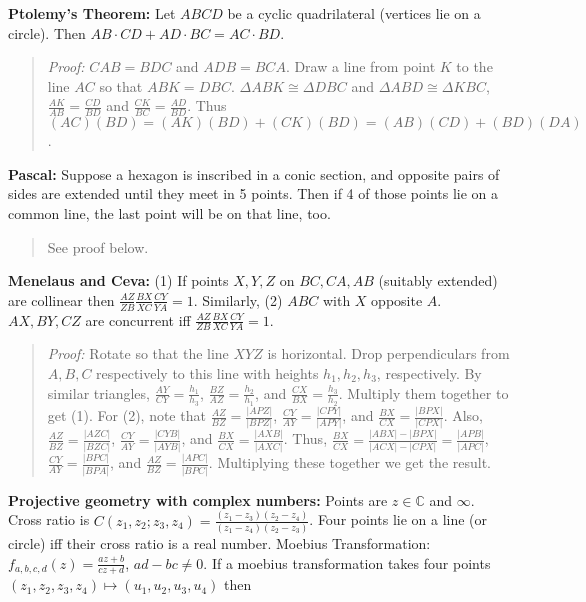 {\bf Ptolemy's Theorem:} Let $ABCD$ be a cyclic quadrilateral (vertices lie
on a circle).  Then $AB \cdot CD + AD \cdot BC = AC \cdot BD$.
\begin{quote}
\emph{Proof:}
$CAB = BDC$ and $ADB = BCA$.  Draw a line from point $K$ to the line $AC$ so that $ABK = DBC$.
$\Delta ABK \cong \Delta DBC$ and $\Delta ABD \cong \Delta KBC$,
${\frac {AK} {AB}} = {\frac {CD} {BD}}$ and ${\frac {CK} {BC}} = {\frac {AD} {BD}}$.
Thus $(AC)(BD) = (AK)(BD) +(CK)(BD) = (AB)(CD) + (BD)(DA)$.
\end{quote}
{\bf Pascal:}
Suppose a hexagon is inscribed in a conic section,  
and opposite pairs of sides are extended until they meet in 5 points. Then if 
4 of those points lie on a common line, the last point will be on that line, too. 
\begin{quote}
See proof below.
\end{quote}
{\bf Menelaus and Ceva:} (1) If points $X, Y, Z$ on $BC, CA, AB$ (suitably extended) are collinear
then $\frac {AZ} {ZB} \frac {BX} {XC} \frac {CY} {YA}  = 1$.  Similarly, (2)
$ABC$ with $X$ opposite $A$. $AX, BY, CZ$ are concurrent iff
$\frac {AZ} {ZB} \frac {BX} {XC} \frac {CY} {YA}  = 1 $.
\begin{quote}
\emph{Proof:} 
Rotate so that the line $XYZ$ is horizontal.  Drop perpendiculars from $A, B, C$ respectively to this
line with heights $h_1, h_2, h_3$, respectively.  By similar triangles,
${\frac {AY}{CY}} = {\frac {h_1} {h_3}}$,
${\frac {BZ}{AZ}} = {\frac {h_2} {h_1}}$, and
${\frac {CX}{BX}} = {\frac {h_3} {h_2}}$.  Multiply them together to get (1).
For (2), note that
${\frac {AZ}{BZ}}= {\frac {|APZ|} {|BPZ|}}$,
${\frac {CY}{AY}}= {\frac {|CPY|} {|APY|}}$, and
${\frac {BX}{CX}}= {\frac {|BPX|} {|CPX|}}$.
Also,
${\frac {AZ}{BZ}}= {\frac {|AZC|} {|BZC|}}$,
${\frac {CY}{AY}}= {\frac {|CYB|} {|AYB|}}$, and
${\frac {BX}{CX}}= {\frac {|AXB|} {|AXC|}}$.
Thus,
${\frac {BX} {CX}}= {\frac {|ABX|-|BPX|}{|ACX|-|CPX|}}= {\frac {|APB|} {|APC|}}$,
${\frac {CY} {AY}}= {\frac {|BPC|} {|BPA|}}$, and
${\frac {AZ} {BZ}}= {\frac {|APC|} {|BPC|}}$.
Multiplying these together we get the result.
\end{quote}
{\bf Projective geometry with complex numbers:}  Points are $z \in {\mathbb C}$ and $\infty$.  Cross ratio is 
$C(z_1, z_2; z_3, z_4) = {\frac {(z_1 - z_3)(z_2 - z_4)}{(z_1-z_4)(z_2-z_3)}}$.  Four points lie on a line (or circle) iff their
cross ratio is a real number.  Moebius Transformation: $f_{a,b,c,d}(z) = {\frac {az+b} {cz+d}}$, $ad-bc \ne 0$.
If a moebius transformation takes four points $(z_1, z_2, z_3, z_4) \mapsto (u_1, u_2, u_3, u_4)$ then
